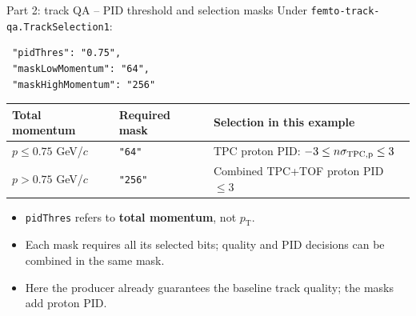 \begin{frame}[fragile]{Part 2: track QA -- PID threshold and selection masks}
 \small Under \texttt{femto-track-qa.TrackSelection1}:
 \begin{lstlisting}
 "pidThres": "0.75",
 "maskLowMomentum": "64",
 "maskHighMomentum": "256"
 \end{lstlisting}
 \renewcommand{\arraystretch}{1.4}
 \begin{tabular}{lll}
 \toprule
 Total momentum & Required mask & Selection in this example\\
 \midrule
 $p\leq0.75$ GeV/$c$ & \texttt{"64"} & TPC proton PID: $-3\leq n\sigma_{\rm TPC,p}\leq3$\\
 $p>0.75$ GeV/$c$ & \texttt{"256"} & Combined TPC+TOF proton PID $\leq3$\\
 \bottomrule
 \end{tabular}
 \par\medskip
 \begin{itemize}
 \item \texttt{pidThres} refers to \textbf{total momentum}, not $p_{\mathrm T}$.
 \item Each mask requires all its selected bits; quality and PID decisions can be combined in the same mask.
 \item Here the producer already guarantees the baseline track quality; the masks add proton PID.
 \end{itemize}
\end{frame}

